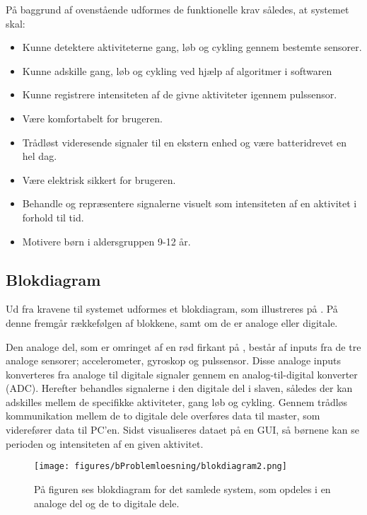 På baggrund af ovenstående udformes de funktionelle krav således, at systemet skal: 
\begin{itemize}
	\item Kunne detektere aktiviteterne gang, løb og cykling gennem bestemte sensorer.
	\item Kunne adskille gang, løb og cykling ved hjælp af algoritmer i softwaren 
	\item Kunne registrere intensiteten af de givne aktiviteter igennem pulssensor.
	\item Være komfortabelt for brugeren.
	\item Trådløst videresende signaler til en ekstern enhed og være batteridrevet en hel dag.
	\item Være elektrisk sikkert for brugeren.
	\item Behandle og repræsentere signalerne visuelt som intensiteten af en aktivitet i forhold til tid.
	\item Motivere børn i aldersgruppen 9-12 år. 
\end{itemize}

\subsection{Blokdiagram}
Ud fra kravene til systemet udformes et blokdiagram, som illustreres på . På denne fremgår rækkefølgen af blokkene, samt om de er analoge eller digitale. 

Den analoge del, som er omringet af en rød firkant på , består af inputs fra de tre analoge sensorer; accelerometer, gyroskop og pulssensor. Disse analoge inputs konverteres fra analoge til digitale signaler gennem en analog-til-digital konverter (ADC). Herefter behandles signalerne i den digitale del i slaven, således der kan adskilles mellem de specifikke aktiviteter, gang løb og cykling. Gennem trådløs kommunikation mellem de to digitale dele overføres data til master, som viderefører data til PC'en. Sidst visualiseres dataet på en GUI, så børnene kan se perioden og intensiteten af en given aktivitet.  

 \begin{figure}[H]
 	\centering
 	\texttt{[image: figures/bProblemloesning/blokdiagram2.png]}
 	\caption{På figuren ses blokdiagram for det samlede system, som opdeles i en analoge del og de to digitale dele.}
 	\label{fig:blokdiagram}
 \end{figure}